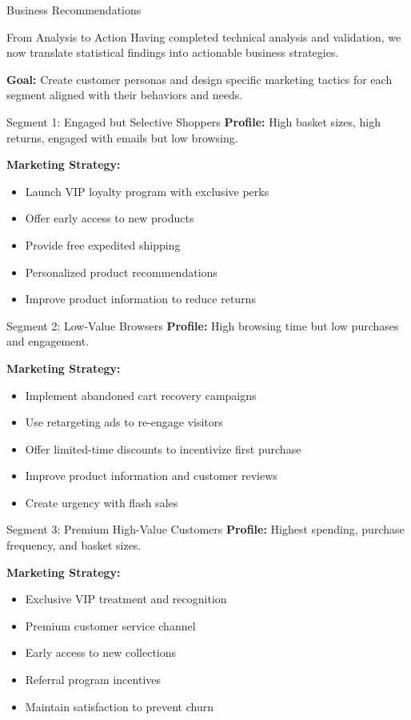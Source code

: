 \documentclass[aspectratio=169,ignorenonframetext]{beamer}
\begin{document}
\begin{frame}{Business Recommendations}
\begin{block}{From Analysis to Action}
Having completed technical analysis and validation, we now translate
statistical findings into actionable business strategies.

\textbf{Goal:} Create customer personas and design specific marketing
tactics for each segment aligned with their behaviors and needs.
\end{block}
\end{frame}

\begin{frame}{Segment 1: Engaged but Selective Shoppers}
\textbf{Profile:} High basket sizes, high returns, engaged with emails
but low browsing.

\textbf{Marketing Strategy:}

\begin{itemize}
\item
  Launch VIP loyalty program with exclusive perks
\item
  Offer early access to new products
\item
  Provide free expedited shipping
\item
  Personalized product recommendations
\item
  Improve product information to reduce returns
\end{itemize}
\end{frame}

\begin{frame}{Segment 2: Low-Value Browsers}
\textbf{Profile:} High browsing time but low purchases and engagement.

\textbf{Marketing Strategy:}

\begin{itemize}
\item
  Implement abandoned cart recovery campaigns
\item
  Use retargeting ads to re-engage visitors
\item
  Offer limited-time discounts to incentivize first purchase
\item
  Improve product information and customer reviews
\item
  Create urgency with flash sales
\end{itemize}
\end{frame}

\begin{frame}{Segment 3: Premium High-Value Customers}
\textbf{Profile:} Highest spending, purchase frequency, and basket
sizes.

\textbf{Marketing Strategy:}

\begin{itemize}
\item
  Exclusive VIP treatment and recognition
\item
  Premium customer service channel
\item
  Early access to new collections
\item
  Referral program incentives
\item
  Maintain satisfaction to prevent churn
\end{itemize}
\end{frame}
\end{document}
